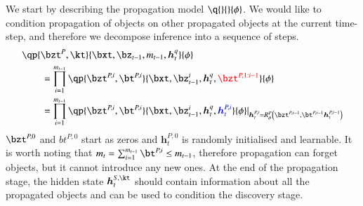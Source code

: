 We start by describing the propagation model $\q{}{}{\phi}$. We would like to condition propagation of objects on other propagated objects at the current time-step, and therefore we decompose inference into a sequence of steps.
\begin{equation}
\begin{aligned}
    &\qp{\bzt^P, \kt}{\bxt, \bz_{t-1}, m_{t-1}, \bm{h}_t^q}{\phi}\\
%    
    &\qquad= \prod_{i=1}^{m_{t-1}} \qp{\bzt^{P, i}, \bt^{P, i}}{\bxt, \bz_{t-1}^i, \bm{h}_t^q, \textcolor{red}{\bzt^{P, 1:i-1}}}{\phi}\\
%    
    &\qquad= \prod_{i=1}^{m_{t-1}} \qp{\bzt^{P, i}, \bt^{P, i}}{\bxt, \bz_{t-1}^i, \bm{h}_t^q, \textcolor{blue}{\bm{h}_t^{P, i}}}{\phi} \lvert_{\bm{h}_t^{P, i} = R_\phi^P \left(  \bzt^{P, i-1}, \bt^{P, i-1} \bm{h}_t^{P, i-1} \right)}
\end{aligned}
\end{equation}
$\bzt^{P, 0}$ and $bt^{P, 0}$ start as zeros and  $\bm{h}_t^{P, 0}$ is randomly initialised and learnable. It is worth noting that $m_t = \sum_{i=1}^{m_{t-1}} \bt^{P,i} \leq m_{t-1}$, therefore propagation can forget objects, but it cannot introduce any new ones. At the end of the propagation stage, the hidden state $\bm{h}_t^{S, \kt}$ should contain information about all the propagated objects and can be used to condition the discovery stage.

